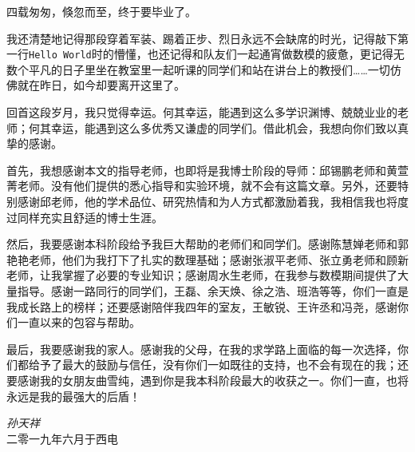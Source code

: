 
\begin{acknowledgments}

  四载匆匆，倏忽而至，终于要毕业了。
  
  我还清楚地记得那段穿着军装、踢着正步、烈日永远不会缺席的时光，记得敲下第一行\texttt{Hello World}时的懵懂，也还记得和队友们一起通宵做数模的疲惫，更记得无数个平凡的日子里坐在教室里一起听课的同学们和站在讲台上的教授们……一切仿佛就在昨日，如今却要离开这里了。
  
  回首这段岁月，我只觉得幸运。何其幸运，能遇到这么多学识渊博、兢兢业业的老师；何其幸运，能遇到这么多优秀又谦虚的同学们。借此机会，我想向你们致以真挚的感谢。
  
  首先，我想感谢本文的指导老师，也即将是我博士阶段的导师：邱锡鹏老师和黄萱菁老师。没有他们提供的悉心指导和实验环境，就不会有这篇文章。另外，还要特别感谢邱老师，他的学术品位、研究热情和为人方式都激励着我，我相信我也将度过同样充实且舒适的博士生涯。
  
  然后，我要感谢本科阶段给予我巨大帮助的老师们和同学们。感谢陈慧婵老师和郭艳艳老师，他们为我打下了扎实的数理基础；感谢张淑平老师、张立勇老师和顾新老师，让我掌握了必要的专业知识；感谢周水生老师，在我参与数模期间提供了大量指导。感谢一路同行的同学们，王磊、余天焕、徐之浩、班浩等等，你们一直是我成长路上的榜样；还要感谢陪伴我四年的室友，王敏锐、王许丞和冯尧，感谢你们一直以来的包容与帮助。
  
  最后，我要感谢我的家人。感谢我的父母，在我的求学路上面临的每一次选择，你们都给予了最大的鼓励与信任，没有你们一如既往的支持，也不会有现在的我；还要感谢我的女朋友曲雪纯，遇到你是我本科阶段最大的收获之一。你们一直，也将永远是我的最强大的后盾！
  
  \begin{flushright}
  	\emph{孙天祥}\\
  	二零一九年六月于西电
  \end{flushright}

\end{acknowledgments}

